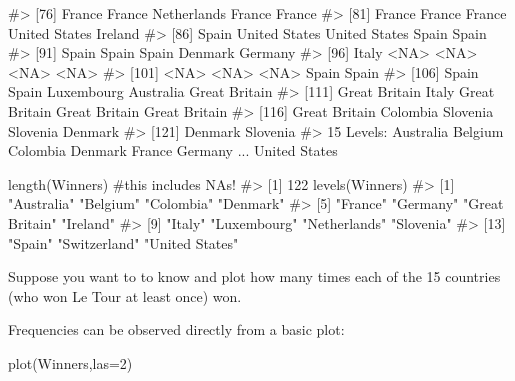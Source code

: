 \documentclass[
  letterpaper,
  DIV=11,
  numbers=noendperiod]{scrreprt}
\newenvironment{Shaded}{\begin{snugshade}}{\end{snugshade}}
\newcommand{\AttributeTok}[1]{\textcolor[rgb]{0.40,0.45,0.13}{#1}}
\newcommand{\CommentTok}[1]{\textcolor[rgb]{0.37,0.37,0.37}{#1}}
\newcommand{\DecValTok}[1]{\textcolor[rgb]{0.68,0.00,0.00}{#1}}
\newcommand{\FunctionTok}[1]{\textcolor[rgb]{0.28,0.35,0.67}{#1}}
\newcommand{\NormalTok}[1]{\textcolor[rgb]{0.00,0.23,0.31}{#1}}
\begin{document}
\begin{Shaded}
\begin{Highlighting}[]
\CommentTok{\#\textgreater{}  [76] France        France        Netherlands   France        France       }
\CommentTok{\#\textgreater{}  [81] France        France        France        United States Ireland      }
\CommentTok{\#\textgreater{}  [86] Spain         United States United States Spain         Spain        }
\CommentTok{\#\textgreater{}  [91] Spain         Spain         Spain         Denmark       Germany      }
\CommentTok{\#\textgreater{}  [96] Italy         \textless{}NA\textgreater{}          \textless{}NA\textgreater{}          \textless{}NA\textgreater{}          \textless{}NA\textgreater{}         }
\CommentTok{\#\textgreater{} [101] \textless{}NA\textgreater{}          \textless{}NA\textgreater{}          \textless{}NA\textgreater{}          Spain         Spain        }
\CommentTok{\#\textgreater{} [106] Spain         Spain         Luxembourg    Australia     Great Britain}
\CommentTok{\#\textgreater{} [111] Great Britain Italy         Great Britain Great Britain Great Britain}
\CommentTok{\#\textgreater{} [116] Great Britain Colombia      Slovenia      Slovenia      Denmark      }
\CommentTok{\#\textgreater{} [121] Denmark       Slovenia     }
\CommentTok{\#\textgreater{} 15 Levels: Australia Belgium Colombia Denmark France Germany ... United States}

\FunctionTok{length}\NormalTok{(Winners) }\CommentTok{\#this includes NA\textquotesingle{}s!}
\CommentTok{\#\textgreater{} [1] 122}
\FunctionTok{levels}\NormalTok{(Winners)}
\CommentTok{\#\textgreater{}  [1] "Australia"     "Belgium"       "Colombia"      "Denmark"      }
\CommentTok{\#\textgreater{}  [5] "France"        "Germany"       "Great Britain" "Ireland"      }
\CommentTok{\#\textgreater{}  [9] "Italy"         "Luxembourg"    "Netherlands"   "Slovenia"     }
\CommentTok{\#\textgreater{} [13] "Spain"         "Switzerland"   "United States"}
\end{Highlighting}
\end{Shaded}

Suppose you want to to know and plot how many times each of the 15
countries (who won Le Tour at least once) won.

Frequencies can be observed directly from a basic plot:

\begin{Shaded}
\begin{Highlighting}[]
\FunctionTok{plot}\NormalTok{(Winners,}\AttributeTok{las=}\DecValTok{2}\NormalTok{)}
\end{Highlighting}
\end{Shaded}
\end{document}
